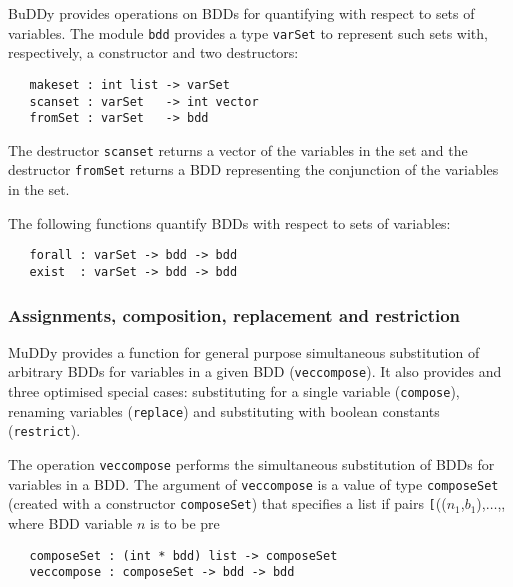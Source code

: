 \documentclass[12pt]{book}
\renewcommand{\t}[1]{\mbox{\tt #1}}
\newcommand{\Buddy}{BuDDy{}}
\newcommand{\Muddy}{MuDDy{}}
\begin{document}
\Buddy{} provides operations on BDDs for quantifying with respect to sets
of variables. The module  \t{bdd} provides a type \t{varSet} to represent such
sets with, respectively, a constructor and two destructors:

\begin{verbatim}
   makeset : int list -> varSet
   scanset : varSet   -> int vector
   fromSet : varSet   -> bdd
\end{verbatim}

The destructor \t{scanset} returns a vector of the variables in the
set and the destructor \t{fromSet} returns a BDD representing the
conjunction of the variables in the set.

The following functions quantify BDDs with respect to sets of variables:

\begin{verbatim}
   forall : varSet -> bdd -> bdd
   exist  : varSet -> bdd -> bdd
\end{verbatim}

\subsubsection{Assignments, composition, replacement and restriction}\label{replace}

\Muddy{} provides a function for general purpose simultaneous
substitution of arbitrary BDDs for variables in a given BDD (\t{veccompose}). It also
provides and three optimised special cases: substituting for a single
variable (\t{compose}), renaming variables (\t{replace}) and
substituting with boolean constants (\t{restrict}).

The operation \t{veccompose} performs the simultaneous substitution 
of BDDs for variables in a BDD. The argument of \t{veccompose}
is a value of type \t{composeSet}
(created with a constructor \t{composeSet})
that specifies a list if pairs \t[(($n_1$,$b_1$),$\ldots$,, where BDD variable $n$ is to be pre

\begin{verbatim}
   composeSet : (int * bdd) list -> composeSet
   veccompose : composeSet -> bdd -> bdd
\end{verbatim}
\end{document}
